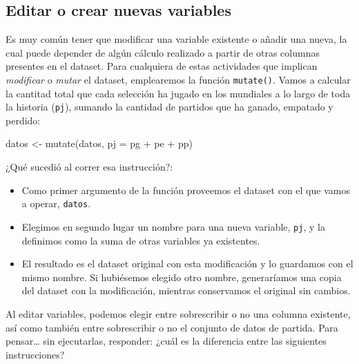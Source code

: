 \documentclass[
]{book}
\newenvironment{Shaded}{\begin{snugshade}}{\end{snugshade}}
\newcommand{\AttributeTok}[1]{\textcolor[rgb]{0.77,0.63,0.00}{#1}}
\newcommand{\FunctionTok}[1]{\textcolor[rgb]{0.00,0.00,0.00}{#1}}
\newcommand{\NormalTok}[1]{#1}
\newcommand{\OtherTok}[1]{\textcolor[rgb]{0.56,0.35,0.01}{#1}}
\newcommand{\SpecialCharTok}[1]{\textcolor[rgb]{0.00,0.00,0.00}{#1}}
\providecommand{\tightlist}{%
  \setlength{\itemsep}{0pt}\setlength{\parskip}{0pt}}
\begin{document}
\hypertarget{editar-o-crear-nuevas-variables}{%
\subsection{Editar o crear nuevas variables}\label{editar-o-crear-nuevas-variables}}

Es muy común tener que modificar una variable existente o añadir una nueva, la cual puede depender de algún cálculo realizado a partir de otras columnas presentes en el dataset. Para cualquiera de estas actividades que implican \emph{modificar} o \emph{mutar} el dataset, emplearemos la función \texttt{mutate()}. Vamos a calcular la cantitad total que cada selección ha jugado en los mundiales a lo largo de toda la historia (\texttt{pj}), sumando la cantidad de partidos que ha ganado, empatado y perdido:

\begin{Shaded}
\begin{Highlighting}[]
\NormalTok{datos }\OtherTok{\textless{}{-}} \FunctionTok{mutate}\NormalTok{(datos, }\AttributeTok{pj =}\NormalTok{ pg }\SpecialCharTok{+}\NormalTok{ pe }\SpecialCharTok{+}\NormalTok{ pp)}
\end{Highlighting}
\end{Shaded}

¿Qué sucedió al correr esa instrucción?:

\begin{itemize}
\tightlist
\item
  Como primer argumento de la función proveemos el dataset con el que vamos a operar, \texttt{datos}.
\item
  Elegimos en segundo lugar un nombre para una nueva variable, \texttt{pj}, y la definimos como la suma de otras variables ya existentes.
\item
  El resultado es el dataset original con esta modificación y lo guardamos con el mismo nombre. Si hubiésemos elegido otro nombre, generaríamos una copia del dataset con la modificación, mientras conservamos el original sin cambios.
\end{itemize}

Al editar variables, podemos elegir entre sobrescribir o no una columna existente, así como también entre sobrescribir o no el conjunto de datos de partida. Para pensar\ldots{} sin ejecutarlas, responder: ¿cuál es la diferencia entre las siguientes instrucciones?
\end{document}
